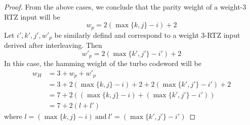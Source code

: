 \documentclass[11pt, oneside, dvipdfmx]{book}
\begin{document}
\begin{proof}
From the above cases, we conclude that the parity weight of a weight-$3$ RTZ input will be $$ w_p =2(\max\{k,j\}-i)+2$$
Let $i',k',j',w'_p$ be similarly defind and correspond to a weight $3$-RTZ input derived after interleaving. Then
$$ w'_p =2(\max\{k',j'\}-i')+2$$
In this case, the hamming weight of the turbo codeword will be 
\begin{equation}
\begin{split}
w_H&=3+w_p+w'_p\\
&=3 + 2(\max\{k,j\}-i)+2+ 2(\max\{k',j'\}-i')+2\\
&=7+2((\max\{k,j\}-i)+(\max\{k',j'\}-i'))\\
&=7+2(l+l')
\end{split}
\end{equation}
where $l=(\max\{k,j\}-i)~\text{and}~l'=(\max\{k',j'\}-i')$

\end{proof}
\newpage
\end{document}
